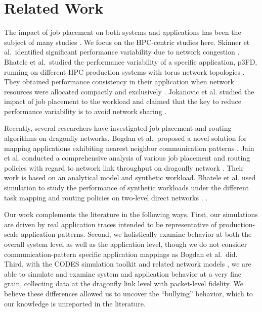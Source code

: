 \section{Related Work}
\label{sec:related work}

The impact of job placement on both systems and applications has been the subject of many studies \cite{dskinner} \cite{abhinav-sc13} \cite{jose-ipdps15}. We focus on the HPC-centric studies here. Skinner et al.\ identified significant performance variability due to network congestion \cite{dskinner} . Bhatele et al.\ studied the performance variability of a specific application, p3FD, running on different HPC production systems with torus network topologies \cite{abhinav-sc13}. They obtained performance consistency in their application when network resources were allocated compactly and exclusively . Jokanovic et al. studied the impact of job placement to the workload and claimed that the key to reduce performance variability is to avoid network sharing \cite{jose-ipdps15}. 

Recently, several researchers have investigated job placement and routing algorithms on dragonfly networks. Bogdan et al.\ proposed a novel solution for mapping applications exhibiting nearest neighbor communication patterns \cite{hoefler-hpdc14} . Jain et al. conducted a comprehensive analysis of various job placement and routing policies with regard to network link throughput on dragonfly network \cite{jain-sc14}. Their work is based on an analytical model and synthetic workload. Bhatele et al. used  simulation to study the performance of synthetic workloads under the different task mapping and routing policies on two-level direct networks \cite{bhatele-sc11}. .

Our work complements the literature in the following ways. First, our simulations are driven by real application traces intended to be representative of production-scale application patterns. Second, we holistically examine behavior at both the overall system level as well as the application level, though we do not consider communication-pattern specific application mappings as Bogdan et al.\ did. Third, with the CODES simulation toolkit and related network models , we are able to simulate and examine system and application behavior at a very fine grain, collecting data at the dragonfly link level with packet-level fidelity. We believe these differences allowed us to uncover the ``bullying'' behavior, which to our knowledge is unreported in the literature.
